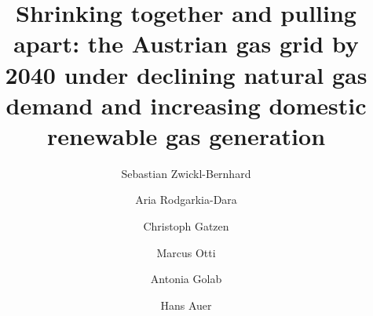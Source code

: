 \documentclass[review]{elsarticle}
\begin{document}
\begin{frontmatter}

\title{Shrinking together and pulling apart: the Austrian gas grid by 2040 under declining natural gas demand and increasing domestic renewable gas generation}
\author[1,2]{Sebastian Zwickl-Bernhard}
\author[3]{Aria Rodgarkia-Dara}
\author[3]{Christoph Gatzen}
\author[1]{Marcus Otti}
\author[1]{Antonia Golab}
\author[1,2]{Hans Auer}
\address[1]{Energy Economics Group (EEG), Technische Universität Wien, Gusshausstrasse 25-29/E370-3, 1040 Wien, Austria}
\address[2]{Industrial Economics and Technology Management, Norwegian University of Science and Technology, Gløshaugen, Alfred Getz vei 3, Trondheim, 7491, Norway}
\address[3]{Frontier Economics Limited, 71 High Holborn, London WC1V 6DA, United Kingdom}

\begin{abstract}
\end{abstract}

\begin{keyword}

\end{keyword}
\end{frontmatter}

\newpage
\end{document}
